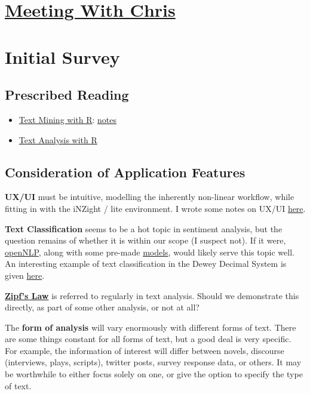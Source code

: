 \documentclass[11pt]{article}
\author{Jason Cairns}
\date{\today}
\title{}
\begin{document}
\tableofcontents

\section{\href{comm.org}{Meeting With Chris}}
\label{sec:orga4fc5b6}
\section{Initial Survey}
\label{sec:org3d075c8}
\subsection{Prescribed Reading}
\label{sec:orge7dceda}
\begin{itemize}
\item \href{https://www.tidytextmining.com}{Text Mining with R}: \href{./text\_mining\_with\_r.org}{notes}
\item \href{https://m-clark.github.io/text-analysis-with-R/}{Text Analysis with R}
\end{itemize}

\subsection{Consideration of Application Features}
\label{sec:org0c4d7cd}

\textbf{UX/UI} must be intuitive, modelling the inherently non-linear workflow,
while fitting in with the iNZight / lite environment. I wrote some notes
on UX/UI \href{./ux\_ui.org}{here}.

\textbf{Text Classification} seems to be a hot topic in sentiment analysis, but
the question remains of whether it is within our scope (I suspect not).
If it were, \href{https://cran.r-project.org/web/packages/openNLP/}{openNLP}, along with some pre-made \href{https://datacube.wu.ac.at/src/contrib/}{models}, would likely serve 
this topic well. An interesting example of text classification in the
Dewey Decimal System is given \href{http://creatingdata.us/models/SRP-classifiers}{here}.

\textbf{\href{../reading/Thurner2015 - Understanding Zipfs Law of Word Frequencies through Sample Space Collapse in Sentence Formation.pdf}{Zipf's Law}} is referred to regularly in text analysis. Should we
demonstrate this directly, as part of some other analysis, or not at
all?

The \textbf{form of analysis} will vary enormously with different forms of
text. There are some things constant for all forms of text, but a good
deal is very specific. For example, the information of interest will
differ between novels, discourse (interviews, plays, scripts), twitter
posts, survey response data, or others. It may be worthwhile to either
focus solely on one, or give the option to specify the type of text.
\end{document}
